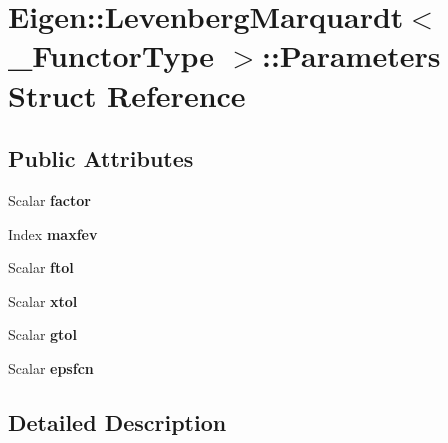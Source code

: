 \hypertarget{struct_eigen_1_1_levenberg_marquardt_1_1_parameters}{}\section{Eigen\+:\+:Levenberg\+Marquardt$<$ \+\_\+\+Functor\+Type $>$\+:\+:Parameters Struct Reference}
\label{struct_eigen_1_1_levenberg_marquardt_1_1_parameters}
\subsection*{Public Attributes}
\begin{DoxyCompactItemize}
\item 
\mbox{\label{struct_eigen_1_1_levenberg_marquardt_1_1_parameters_a2d0cb2b7d405fb165b264aa61f16cbca}} 
Scalar {\bfseries factor}
\item 
\mbox{\label{struct_eigen_1_1_levenberg_marquardt_1_1_parameters_aa3bf61cb8254b9a7d924920cab3a2311}} 
Index {\bfseries maxfev}
\item 
\mbox{\label{struct_eigen_1_1_levenberg_marquardt_1_1_parameters_a1caca3072569971407111912bb861599}} 
Scalar {\bfseries ftol}
\item 
\mbox{\label{struct_eigen_1_1_levenberg_marquardt_1_1_parameters_ab5364d8251a86b1ecb4959c233092c54}} 
Scalar {\bfseries xtol}
\item 
\mbox{\label{struct_eigen_1_1_levenberg_marquardt_1_1_parameters_a24bc8140c7b91e465867700fc84640ca}} 
Scalar {\bfseries gtol}
\item 
\mbox{\label{struct_eigen_1_1_levenberg_marquardt_1_1_parameters_aeb79e200a070bbbdab814231c5483394}} 
Scalar {\bfseries epsfcn}
\end{DoxyCompactItemize}


\subsection{Detailed Description}
